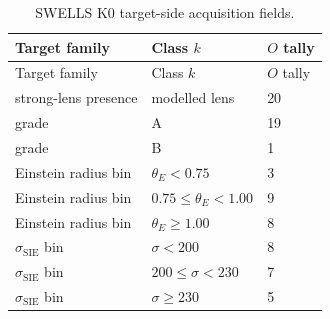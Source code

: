 \scriptsize
\begin{longtable}{p{}p{}p{}}
\caption{SWELLS K0 target-side acquisition fields.}\label{tab:manual-lensing-swells-k0}\\
\toprule
Target family & Class $k$ & $O$ tally\\
\midrule
\endfirsthead
\toprule
Target family & Class $k$ & $O$ tally\\
\midrule
\endhead
strong-lens presence & modelled lens & 20\\
grade & A & 19\\
grade & B & 1\\
Einstein radius bin & \(\theta_E<0.75\) & 3\\
Einstein radius bin & \(0.75\le\theta_E<1.00\) & 9\\
Einstein radius bin & \(\theta_E\ge1.00\) & 8\\
\(\sigma_{\mathrm{SIE}}\) bin & \(\sigma<200\) & 8\\
\(\sigma_{\mathrm{SIE}}\) bin & \(200\le\sigma<230\) & 7\\
\(\sigma_{\mathrm{SIE}}\) bin & \(\sigma\ge230\) & 5\\
\bottomrule
\end{longtable}
\normalsize
